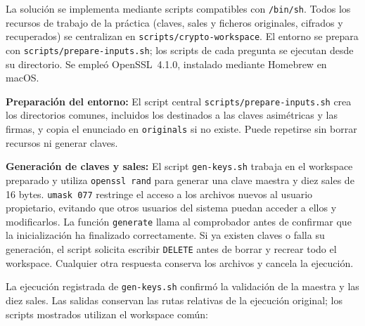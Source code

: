 La solución se implementa mediante scripts compatibles con \texttt{/bin/sh}. Todos los recursos de trabajo de la práctica (claves, sales y ficheros originales, cifrados y recuperados) se centralizan en \texttt{scripts/crypto-workspace}. El entorno se prepara con \texttt{scripts/prepare-inputs.sh}; los scripts de cada pregunta se ejecutan desde su directorio. Se empleó OpenSSL~4.1.0, instalado mediante Homebrew en macOS.



\textbf{Preparación del entorno:} El script central \texttt{scripts/prepare-inputs.sh} crea los directorios comunes, incluidos los destinados a las claves asimétricas y las firmas, y copia el enunciado en \texttt{originals} si no existe. Puede repetirse sin borrar recursos ni generar claves.

\begingroup
\renewcommand{\lstlistingname}{Script}

\endgroup

\textbf{Generación de claves y sales:}
El script \texttt{gen-keys.sh} trabaja en el workspace preparado y utiliza \texttt{openssl rand} para generar una clave maestra y diez sales de 16 bytes. 
\texttt{umask 077} restringe el acceso a los archivos nuevos al usuario propietario, evitando que otros usuarios del sistema puedan acceder a ellos y modificarlos.
La función \texttt{generate} llama al comprobador antes de confirmar que la inicialización ha finalizado correctamente.
Si ya existen claves o falla su generación, el script solicita escribir \texttt{DELETE} antes de borrar y recrear todo el workspace. Cualquier otra respuesta conserva los archivos y cancela la ejecución.

\begingroup
\renewcommand{\lstlistingname}{Script}

\endgroup

La ejecución registrada de \texttt{gen-keys.sh} confirmó la validación de la maestra y las diez sales. Las salidas conservan las rutas relativas de la ejecución original; los scripts mostrados utilizan el workspace común:

